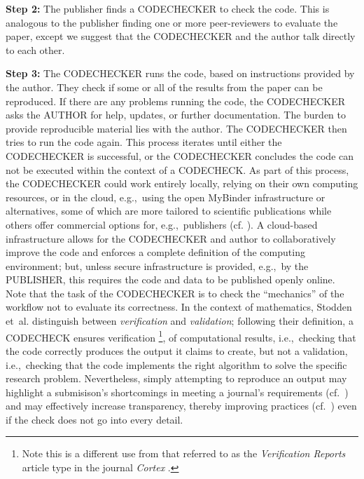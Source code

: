 \documentclass[12pt]{article}
\begin{document}
\textbf{Step 2:} The publisher finds a CODECHECKER to check the
code. This is analogous to the publisher finding one or more
peer-reviewers to evaluate the paper, except we suggest that the
CODECHECKER and the author talk directly to each other.

\textbf{Step 3:} The CODECHECKER runs the code, based on instructions provided by
the author. They check if some or all of the results from the paper can be
reproduced. If there are
any problems running the code, the CODECHECKER asks the AUTHOR for help,
updates, or further documentation.
The burden to provide reproducible material lies with the author.
The CODECHECKER then tries to run the code again.
This process iterates until either the CODECHECKER is successful,
or the CODECHECKER concludes the code can not be executed within the context of a CODECHECK.
As part of this process, the CODECHECKER could work entirely locally, relying on their own computing resources, or in the cloud, e.g.,~using the open MyBinder infrastructure \cite{jupyter_binder_2018} or alternatives, some of which are more tailored to scientific publications while others offer commercial options for, e.g.,~publishers (cf. \cite{konkol_publishing_2020}).
A cloud-based infrastructure allows for the CODECHECKER and author to collaboratively improve the code and enforces a complete definition of the computing environment; but, unless secure infrastructure is provided, e.g.,~by the PUBLISHER, this requires the code and data to be published openly online.
Note that the task of the CODECHECKER is to check the ``mechanics'' of the workflow not to evaluate its correctness. 
In the context of mathematics, Stodden et~al. \cite{stodden_setting_2013} distinguish between \emph{verification} and \emph{validation};
following their definition, a CODECHECK ensures verification
\footnote{Note this is a different use from that referred to as the \emph{Verification Reports} article type in the journal \emph{Cortex} \cite{chambers_verification_2020}.},
of computational results, i.e.,~checking that the code correctly produces the output it claims to create, but not a validation, i.e.,~checking that the code implements the right algorithm to solve the specific research problem.
Nevertheless, simply attempting to reproduce an output may highlight a submisison's shortcomings in meeting a journal's requirements (cf.~\cite{christian_journal_2020}) and may effectively increase transparency, thereby improving practices (cf.~\cite{nosek_scientific_2012}) even if the check does not go into every detail.
\end{document}
